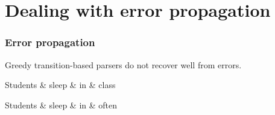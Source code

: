 \documentclass[t]{beamer}
\begin{document}
\section{Dealing with error propagation}

\begin{frame}
    \frametitle{Error propagation}
    Greedy transition-based parsers do not recover well from errors.
    \begin{center}
    \begin{dependency}
	\begin{deptext}[column sep=.7cm]
	Students \& sleep \& in \& class \\
	\end{deptext}
	\end{dependency}
    \begin{dependency}
	\begin{deptext}[column sep=.7cm]
	Students \& sleep \& in \& often \\
	\end{deptext}
	\end{dependency}
    \end{center}
\end{frame}
\end{document}
